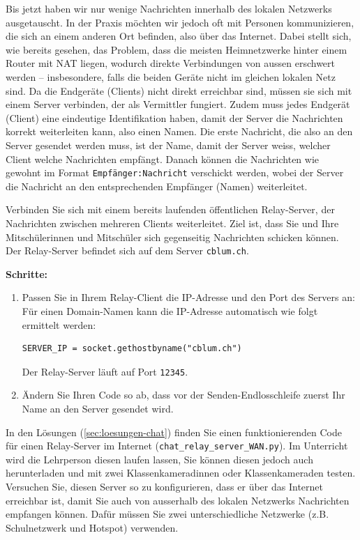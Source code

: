Bis jetzt haben wir nur wenige Nachrichten innerhalb des lokalen Netzwerks ausgetauscht. In der Praxis möchten wir jedoch oft mit Personen kommunizieren, die sich an einem anderen Ort befinden, also über das Internet. Dabei stellt sich, wie bereits gesehen, das Problem, dass die meisten Heimnetzwerke hinter einem Router mit \gls{NAT} liegen, wodurch direkte Verbindungen von aussen erschwert werden -- insbesondere, falls die beiden Geräte nicht im gleichen lokalen Netz sind. Da die Endgeräte (Clients) nicht direkt erreichbar sind, müssen sie sich mit einem Server verbinden, der als Vermittler fungiert. Zudem muss jedes Endgerät (Client) eine eindeutige Identifikation haben, damit der Server die Nachrichten korrekt weiterleiten kann, also einen Namen. Die erste Nachricht, die also an den Server gesendet werden muss, ist der Name, damit der Server weiss, welcher Client welche Nachrichten empfängt. Danach können die Nachrichten wie gewohnt im Format \texttt{Empfänger:Nachricht} verschickt werden, wobei der Server die Nachricht an den entsprechenden Empfänger (Namen) weiterleitet.

\begin{myexercise}\label{ex:chat-relay-client-wan}
    Verbinden Sie sich mit einem bereits laufenden öffentlichen Relay-Server, der Nachrichten zwischen mehreren Clients weiterleitet. Ziel ist, dass Sie und Ihre Mitschülerinnen und Mitschüler sich gegenseitig Nachrichten schicken können. Der Relay-Server befindet sich auf dem Server \texttt{cblum.ch}.

    \textbf{Schritte:}
    \begin{enumerate}
        \item Passen Sie in Ihrem Relay-Client die \gls{IP}-Adresse und den Port des Servers an: Für einen Domain-Namen kann die \gls{IP}-Adresse automatisch wie folgt ermittelt werden:
              \begin{lstlisting}
SERVER_IP = socket.gethostbyname("cblum.ch")
\end{lstlisting}
              Der Relay-Server läuft auf Port \texttt{12345}.
        \item Ändern Sie Ihren Code so ab, dass vor der Senden-Endlosschleife zuerst Ihr Name an den Server gesendet wird.
    \end{enumerate}
\end{myexercise}

\begin{mychallenge}
    In den Lösungen (\cref{sec:loesungen-chat}) finden Sie einen funktionierenden Code für einen Relay-Server im Internet (\texttt{chat\_relay\_server\_WAN.py}). Im Unterricht wird die Lehrperson diesen laufen lassen, Sie können diesen jedoch auch herunterladen und mit zwei Klassenkameradinnen oder Klassenkameraden testen. Versuchen Sie, diesen Server so zu konfigurieren, dass er über das Internet erreichbar ist, damit Sie auch von ausserhalb des lokalen Netzwerks Nachrichten empfangen können. Dafür müssen Sie zwei unterschiedliche Netzwerke (z.B. Schulnetzwerk und Hotspot) verwenden.
\end{mychallenge}

